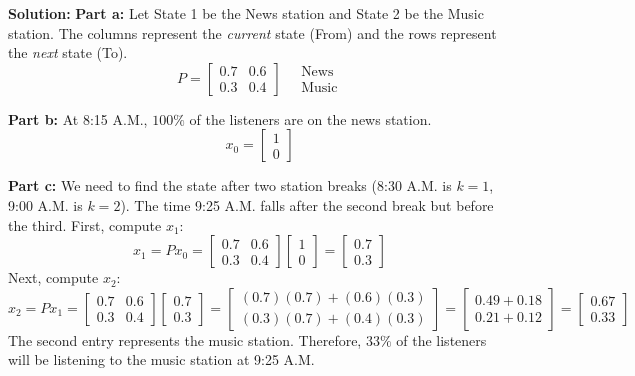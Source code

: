 \documentclass[11pt, letterpaper]{article}
\theoremstyle{definition}
\theoremstyle{remark}
\begin{document}
\textbf{Solution:}
\textbf{Part a:} Let State 1 be the News station and State 2 be the Music station. The columns represent the \textit{current} state (From) and the rows represent the \textit{next} state (To).
\[ P = \begin{bmatrix} 0.7 & 0.6 \\ 0.3 & 0.4 \end{bmatrix} \quad \begin{array}{l} \text{News} \\ \text{Music} \end{array} \]

\textbf{Part b:} At 8:15 A.M., $100\%$ of the listeners are on the news station.
\[ x_0 = \begin{bmatrix} 1 \\ 0 \end{bmatrix} \]

\textbf{Part c:} We need to find the state after two station breaks (8:30 A.M. is $k=1$, 9:00 A.M. is $k=2$). The time 9:25 A.M. falls after the second break but before the third.
First, compute $x_1$:
\[ x_1 = P x_0 = \begin{bmatrix} 0.7 & 0.6 \\ 0.3 & 0.4 \end{bmatrix} \begin{bmatrix} 1 \\ 0 \end{bmatrix} = \begin{bmatrix} 0.7 \\ 0.3 \end{bmatrix} \]
Next, compute $x_2$:
\[ x_2 = P x_1 = \begin{bmatrix} 0.7 & 0.6 \\ 0.3 & 0.4 \end{bmatrix} \begin{bmatrix} 0.7 \\ 0.3 \end{bmatrix} = \begin{bmatrix} (0.7)(0.7) + (0.6)(0.3) \\ (0.3)(0.7) + (0.4)(0.3) \end{bmatrix} = \begin{bmatrix} 0.49 + 0.18 \\ 0.21 + 0.12 \end{bmatrix} = \begin{bmatrix} 0.67 \\ 0.33 \end{bmatrix} \]
The second entry represents the music station. Therefore, \textbf{$33\%$} of the listeners will be listening to the music station at 9:25 A.M.
\end{document}
